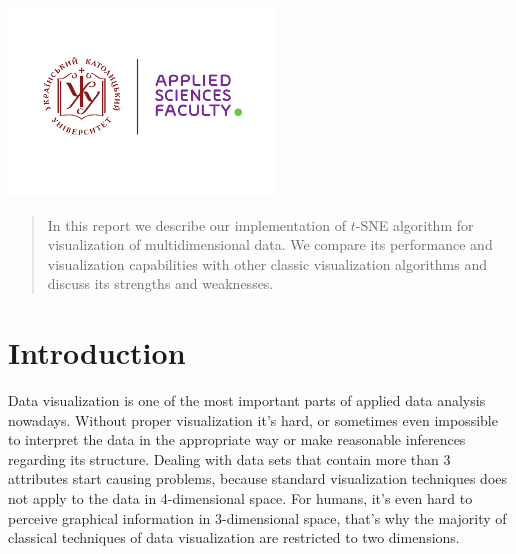 \begin{titlepage}

\includegraphics[height=5cm]{UCU-Apps.png}\\[1cm] %
 

\vfill %

\end{titlepage}


\begin{abstract}
In this report we describe our implementation of $t$-SNE algorithm for visualization of multidimensional data. We compare its performance and visualization capabilities with other classic visualization algorithms and discuss its strengths and weaknesses.
	
\end{abstract}

\section{Introduction}

Data visualization is one of the most important parts of applied data analysis nowadays. Without proper visualization it’s hard, or sometimes even impossible to interpret the data in the appropriate way or make reasonable inferences regarding its structure. Dealing with data sets that contain more than 3 attributes start causing problems, because standard visualization techniques does not apply to the data in 4-dimensional space. For humans, it’s even hard to perceive graphical information in 3-dimensional space, that’s why the majority of classical techniques of data visualization are restricted to two dimensions. \\

